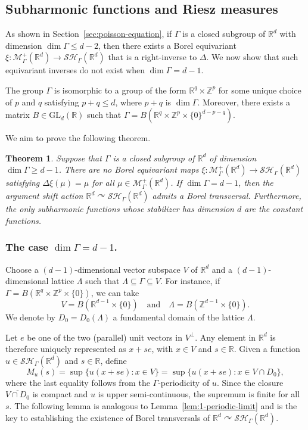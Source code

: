 \documentclass[12pt]{paper}
\numberwithin{equation}{section}
\theoremstyle{plain}
\newtheorem{theorem}{Theorem}[section]
\theoremstyle{definition}
\newcommand{\R}{\mathbb{R}}
\newcommand{\Rd}{\mathbb{R}^{d}}
\newcommand{\Z}{\mathbb{Z}}
\newcommand{\measp}[2][]{\mathcal{M}_{#1}^+(#2)}
\newcommand{\sharm}[2][]{\mathcal{SH}_{#1}(#2)}
\newcommand{\acts}{\curvearrowright}
\begin{document}
\subsection{Subharmonic functions and Riesz measures}\label{sec:subh-funct-riesz}
As shown in Section~\ref{sec:poisson-equation}, if \(\Gamma\) is a closed subgroup of \(\Rd\) with
dimension \(\dim \Gamma \le d-2\), then there exists a Borel equivariant
\(\xi : \measp[\Gamma]{\Rd} \to \sharm[\Gamma]{\Rd} \) that is a right-inverse to \(\Delta\).  We
now show that such equivariant inverses do not exist when \(\dim \Gamma = d-1\).

The group \(\Gamma\) is isomorphic to a group of the form \(\R^{q} \times \Z^{p}\) for some unique
choice of \(p\) and \(q\) satisfying \(p + q \le d\), where \(p+q\) is \(\dim \Gamma\).  Moreover,
there exists a matrix \(B \in \mathrm{GL}_{d}(\R)\) such that
\(\Gamma = B(\R^{q} \times \Z^{p} \times \{0\}^{d-p-q})\).

We aim to prove the following theorem.

\begin{theorem}
  \label{thm:subharmonic-large-stabilizers}
  Suppose that \(\Gamma\) is a closed subgroup of \(\Rd\) of dimension \(\dim \Gamma \ge
  d-1\). There are no Borel equivariant maps \(\xi : \measp[\Gamma]{\Rd} \to \sharm[\Gamma]{\Rd}\)
  satisfying \(\Delta\xi(\mu) = \mu\) for all \(\mu \in \measp[\Gamma]{\Rd}\).  If
  \(\dim \Gamma = d-1\), then the argument shift action \(\Rd \acts \sharm[\Gamma]{\Rd} \) admits a
  Borel transversal. Furthermore, the only subharmonic functions whose stabilizer has dimension
  \(d\) are the constant functions.
\end{theorem}

\subsubsection{The case \texorpdfstring{\(\dim \Gamma = d-1\)}{dim = d-1}.} Choose a
\((d-1)\)-dimensional vector subspace \(V\) of \(\Rd\) and a \((d-1)\)-dimensional lattice
\(\Lambda\) such that \(\Lambda \subseteq \Gamma \subseteq V\).  For instance, if
\(\Gamma = B(\R^{q} \times \Z^{p} \times \{0\})\), we can take
\[
  V=B (\R^{d-1}\times \{0\})\quad \textrm{and} \quad \Lambda = B(\Z^{d-1}\times \{0\}).
\]
We denote by \(D_0=D_0(\Lambda)\) a fundamental domain of the lattice \(\Lambda\).

Let \(e\) be one of the two (parallel) unit vectors in \(V^\perp\).  Any element in \(\Rd\) is
therefore uniquely represented as \(x+se\), with \(x\in V\) and \(s \in \R\).  Given a function
\(u\in \sharm[\Gamma]{\Rd}\) and \(s \in \R\), define
\begin{equation}
  \label{eq:def-Ms}
  M_u(s)=\sup\big\{u(x+se):x\in V \big\}=\sup\big\{u(x+se):x\in V\cap D_0 \big\},
\end{equation}
where the last equality follows from the \(\Gamma\)-periodicity of \(u\).  Since the closure
\(\overline{V\cap D_0}\) is compact and \(u\) is upper semi-continuous, the supremum is finite for
all~\(s\).  The following lemma is analogous to Lemma~\ref{lem:1-periodic-limit} and is the key to
establishing the existence of Borel transversals of \(\Rd \acts \sharm[\Gamma]{\Rd}\).
\end{document}
